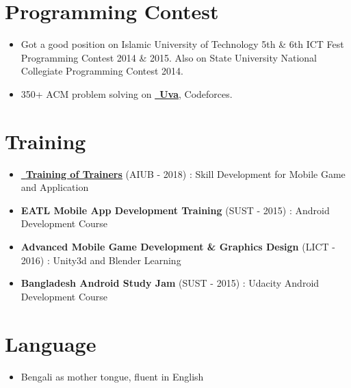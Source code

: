 \documentclass[letterpaper,11pt]{article}
\newcommand{\resumeItem}[1]{
  \item\small{
    {#1 \vspace{-2pt}}
  }
}
\newcommand{\resumeItemListStart}{\begin{itemize}}
\newcommand{\resumeItemListEnd}{\end{itemize}\vspace{-5pt}}
\begin{document}
\section{Programming Contest}
            \resumeItemListStart
                \resumeItem{Got a good position on Islamic University of Technology 5th \& 6th ICT Fest Programming Contest 2014 \& 2015. Also on State University National Collegiate Programming Contest 2014.}
                \resumeItem{350+ ACM problem solving on 
                {\href{https://uhunt.onlinejudge.org/id/249088}{\raisebox{-0.2\height}\ \underline{\textbf{Uva}}}}, Codeforces.}
            \resumeItemListEnd
\vspace{-10pt}

\section{Training}
  \resumeItemListStart
    \resumeItem
      {\href{https://gameapp.gov.bd/}{\raisebox{-0.2\height}\ \underline{\textbf{Training of Trainers}}} (AIUB - 2018) :
      {Skill Development for Mobile Game and Application}}
        \resumeItem
        {\textbf{EATL Mobile App Development Training} (SUST - 2015) : {Android Development Course}}
        \resumeItem
      {\textbf{Advanced Mobile Game Development \& Graphics Design} (LICT - 2016) :
      {Unity3d and Blender Learning}}
        \resumeItem
      {\textbf{Bangladesh Android Study Jam} (SUST - 2015) :
      {Udacity Android Development Course}}
  \resumeItemListEnd
\vspace{-10pt}

\section{Language}
  \resumeItemListStart
    \resumeItem
      {Bengali as mother tongue, fluent in English}
  \resumeItemListEnd
  
\end{document}
